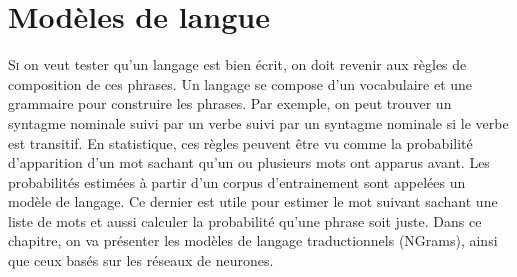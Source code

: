 \documentclass{KodeBook}
\begin{document}
		\mainmatter
	
\fi
\chapter{Modèles de langue}

\begin{introduction}
	\lettrine{S}{i} on veut tester qu'un langage est bien écrit, on doit revenir aux règles de composition de ces phrases.
	Un langage se compose d'un vocabulaire et une grammaire pour construire les phrases.
	Par exemple, on peut trouver un syntagme nominale suivi par un verbe suivi par un syntagme nominale si le verbe est transitif.
	En statistique, ces règles peuvent être vu comme la probabilité d'apparition d'un mot sachant qu'un ou plusieurs mots ont apparus avant. 
	Les probabilités estimées à partir d'un corpus d'entrainement sont appelées un modèle de langage. 
	Ce dernier est utile pour estimer le mot suivant sachant une liste de mots et aussi calculer la probabilité qu'une phrase soit juste.
	Dans ce chapitre, on va présenter les modèles de langage traductionnels (NGrams), ainsi que ceux basés sur les réseaux de neurones.
\end{introduction} 
\end{document}

